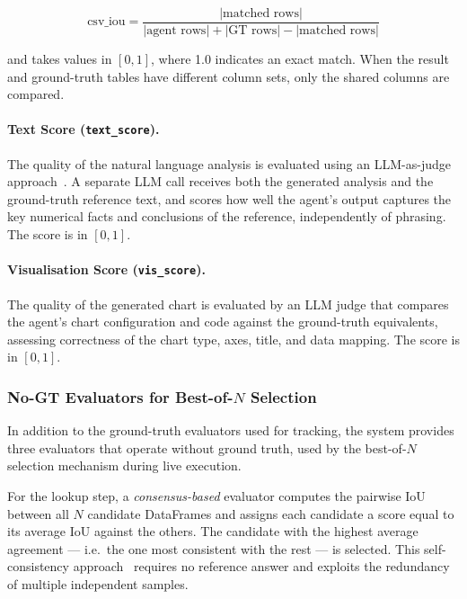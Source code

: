 \documentclass[11pt,a4paper]{article}
\begin{document}
\begin{equation}
    \text{csv\_iou} = \frac{|\text{matched rows}|}{|\text{agent rows}| + |\text{GT rows}| - |\text{matched rows}|}
    \label{eq:iou}
\end{equation}

\noindent and takes values in $[0, 1]$, where 1.0 indicates an exact match. When
the result and ground-truth tables have different column sets, only the shared
columns are compared.

\paragraph{Text Score (\texttt{text\_score}).}
The quality of the natural language analysis is evaluated using an LLM-as-judge
approach~\cite{zheng2023judging}. A separate LLM call receives both the generated
analysis and the ground-truth reference text, and scores how well the agent's output
captures the key numerical facts and conclusions of the reference, independently of
phrasing. The score is in $[0, 1]$.

\paragraph{Visualisation Score (\texttt{vis\_score}).}
The quality of the generated chart is evaluated by an LLM judge that compares the
agent's chart configuration and code against the ground-truth equivalents, assessing
correctness of the chart type, axes, title, and data mapping. The score is in $[0, 1]$.

\subsubsection{No-GT Evaluators for Best-of-\texorpdfstring{$N$}{N} Selection}

In addition to the ground-truth evaluators used for tracking, the system provides
three evaluators that operate without ground truth, used by the best-of-$N$
selection mechanism during live execution.

For the lookup step, a \textit{consensus-based} evaluator computes the pairwise
IoU between all $N$ candidate DataFrames and assigns each candidate a score equal
to its average IoU against the others. The candidate with the highest average
agreement — i.e.\ the one most consistent with the rest — is selected. This
self-consistency approach~\cite{wang2023selfconsistency} requires no reference
answer and exploits the redundancy of multiple independent samples.
\end{document}
